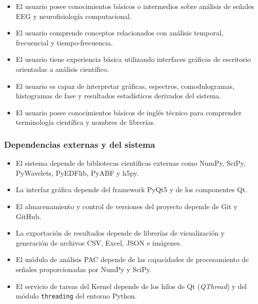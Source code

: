 \documentclass[12pt, letterpaper]{article}
\begin{document}
\begin{itemize}

\item El usuario posee conocimientos básicos o intermedios sobre análisis de
señales EEG y neurofisiología computacional.

\item El usuario comprende conceptos relacionados con análisis temporal,
frecuencial y tiempo-frecuencia.

\item El usuario tiene experiencia básica utilizando interfaces gráficas de
escritorio orientadas a análisis científico.

\item El usuario es capaz de interpretar gráficas, espectros, comodulogramas,
histogramas de fase y resultados estadísticos derivados del sistema.

\item El usuario posee conocimientos básicos de inglés técnico para
comprender terminología científica y nombres de librerías.

\end{itemize}

\subsubsection{Dependencias externas y del sistema}

\begin{itemize}

\item El sistema depende de bibliotecas científicas externas como NumPy,
SciPy, PyWavelets, PyEDFlib, PyABF y h5py.

\item La interfaz gráfica depende del framework PyQt5 y de los componentes
Qt.

\item El almacenamiento y control de versiones del proyecto depende de Git y
GitHub.

\item La exportación de resultados depende de librerías de visualización y
generación de archivos CSV, Excel, JSON e imágenes.

\item El módulo de análisis PAC depende de las capacidades de procesamiento de
señales proporcionadas por NumPy y SciPy.

\item El servicio de tareas del Kernel depende de los hilos de Qt (\textit{QThread})
y del módulo \texttt{threading} del entorno Python.

\end{itemize}
\end{document}
